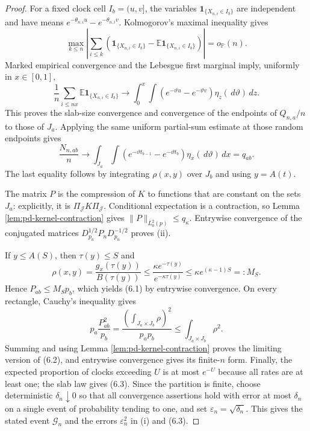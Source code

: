 \documentclass[11pt]{article}
\theoremstyle{remark}
\newcommand{\Pp}{\mathbb P}
\newcommand{\Ee}{\mathbb E}
\newcommand{\one}{\mathbf 1}
\newcommand{\dd}{\,d}
\begin{document}
\begin{proof}
For a fixed clock cell $I_b=(u,v]$, the variables
$\one_{\{X_{n,i}\in I_b\}}$ are independent and have means
$e^{-\theta_{n,i}u}-e^{-\theta_{n,i}v}$.  Kolmogorov's maximal inequality
gives
\[
 \max_{k\le n}\left|\sum_{i\le k}
 \left(\one_{\{X_{n,i}\in I_b\}}
 -\Ee\one_{\{X_{n,i}\in I_b\}}\right)\right|=o_{\Pp}(n).
\]
Marked empirical convergence and the Lebesgue first marginal imply, uniformly
in $x\in[0,1]$,
\[
 \frac1n\sum_{i\le nx}
 \Ee\one_{\{X_{n,i}\in I_b\}}
 \longrightarrow
 \int_0^x\int
 (e^{-\vartheta u}-e^{-\vartheta v})
 \eta_z(\dd\vartheta)\dd z.
\]
This proves the slab-size convergence and convergence of the endpoints of
$Q_{n,a}/n$ to those of $J_a$.  Applying the same uniform partial-sum estimate
at those random endpoints gives
\[
 \frac{N_{n,ab}}n\longrightarrow
 \int_{J_a}\int
 (e^{-\vartheta t_{b-1}}-e^{-\vartheta t_b})
 \eta_x(\dd\vartheta)\dd x=q_{ab}.
\]
The last equality follows by integrating $\rho(x,y)$ over $J_b$ and using
$y=A(t)$.

The matrix $P$ is the compression of $K$ to functions that are constant on the
sets $J_a$: explicitly, it is $\Pi_{\mathcal J}K\Pi_{\mathcal J}$.  Conditional
expectation is a contraction, so Lemma \ref{lem:pd-kernel-contraction} gives
$\|P\|_{L^2_0(p)}\le q_\kappa$.  Entrywise convergence of the conjugated
matrices
$D_{p_n}^{1/2}P_nD_{p_n}^{-1/2}$ proves (ii).

If $y\le A(S)$, then $\tau(y)\le S$ and
\[
 \rho(x,y)
 =\frac{g_x(\tau(y))}{B(\tau(y))}
 \le\frac{\kappa e^{-\tau(y)}}{e^{-\kappa\tau(y)}}
 \le\kappa e^{(\kappa-1)S}=:M_S.
\]
Hence $P_{ab}\le M_Sp_b$, which yields (6.1) by entrywise convergence.  On
every rectangle, Cauchy's inequality gives
\[
 p_a\frac{P_{ab}^2}{p_b}
 =\frac{(\int_{J_a\times J_b}\rho)^2}{p_ap_b}
 \le\int_{J_a\times J_b}\rho^2.
\]
Summing and using Lemma \ref{lem:pd-kernel-contraction} proves the limiting
version of (6.2), and entrywise convergence gives its finite-$n$ form.  Finally,
the expected proportion of clocks exceeding $U$ is at most $e^{-U}$ because
all rates are at least one; the slab law gives (6.3).  Since the partition is finite, choose deterministic $\delta_n\downarrow0$
so that all convergence assertions hold with error at most $\delta_n$ on a
single event of probability tending to one, and set
$\varepsilon_n=\sqrt{\delta_n}$.  This gives the stated event
$\mathcal G_n$ and the errors $\varepsilon_n^2$ in (i) and (6.3).
\end{proof}
\end{document}
